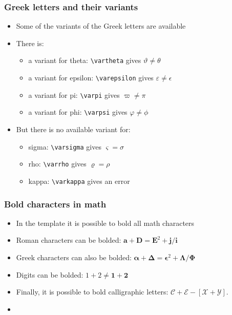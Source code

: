 \documentclass[11pt,xcolor={dvipsnames},hyperref={pdftex,pdfpagemode=UseNone,hidelinks,pdfdisplaydoctitle=true},usepdftitle=false]{beamer}
\begin{document}
\begin{frame}
\frametitle{Greek letters and their variants}
\begin{itemize}
\item Some  of the variants of the Greek letters are available
\item There is:
\begin{itemize}
\item a variant for theta: \texttt{\textbackslash vartheta} gives $\vartheta \neq \theta$
\item a variant for epsilon: \texttt{\textbackslash varepsilon} gives $\varepsilon \neq \epsilon$
\item a variant for pi: \texttt{\textbackslash varpi} gives $\varpi \neq \pi$
\item a variant for phi: \texttt{\textbackslash varpsi} gives $\varphi \neq \phi$
\end{itemize}
\item But there is no available variant for:
\begin{itemize}
\item sigma: \texttt{\textbackslash varsigma} gives $\varsigma = \sigma$
\item rho: \texttt{\textbackslash varrho} gives $\varrho = \rho$
\item kappa: \texttt{\textbackslash varkappa} gives an error
\end{itemize}
 \end{itemize}	
\end{frame}

\begin{frame}
\frametitle{Bold characters in math}
\begin{itemize}
\item In the template it is possible to bold all math characters
\item Roman characters can be bolded: $\bm{a} + \bm{D} = \bm{E}^2 + \bm{j}/\bm{i}$
\item Greek characters can also be bolded: $\bm{\alpha} + \bm{\Delta} = \bm{\epsilon}^2 + \bm{\Lambda}/\bm{\Phi}$
\item Digits can be bolded: $1 + 2 \neq \bm{1} + \bm{2}$
\item Finally, it is possible to bold calligraphic letters: $\bm{\mathcal{C}} + \bm{\mathcal{E}} - [\bm{\mathcal{X}}+\bm{\mathcal{Y}}]$.
\item {}
\end{itemize}	
\end{frame}
\end{document}
